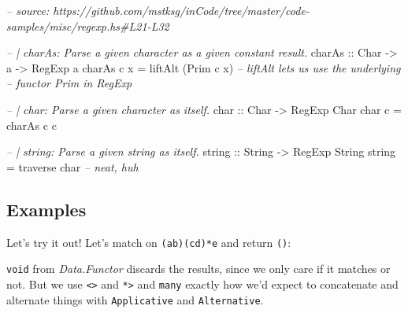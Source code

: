 \documentclass[]{article}
\newenvironment{Shaded}{}{}
\newcommand{\CharTok}[1]{\textcolor[rgb]{0.25,0.44,0.63}{#1}}
\newcommand{\CommentTok}[1]{\textcolor[rgb]{0.38,0.63,0.69}{\textit{#1}}}
\newcommand{\DataTypeTok}[1]{\textcolor[rgb]{0.56,0.13,0.00}{#1}}
\newcommand{\FunctionTok}[1]{\textcolor[rgb]{0.02,0.16,0.49}{#1}}
\newcommand{\NormalTok}[1]{#1}
\newcommand{\OtherTok}[1]{\textcolor[rgb]{0.00,0.44,0.13}{#1}}
\newcommand{\StringTok}[1]{\textcolor[rgb]{0.25,0.44,0.63}{#1}}
\begin{document}
\begin{Shaded}
\begin{Highlighting}[]
\CommentTok{-- source: https://github.com/mstksg/inCode/tree/master/code-samples/misc/regexp.hs#L21-L32}

\CommentTok{-- | charAs: Parse a given character as a given constant result.}
\OtherTok{charAs ::} \DataTypeTok{Char} \OtherTok{->}\NormalTok{ a }\OtherTok{->} \DataTypeTok{RegExp}\NormalTok{ a}
\NormalTok{charAs c x }\FunctionTok{=}\NormalTok{ liftAlt (}\DataTypeTok{Prim}\NormalTok{ c x)     }\CommentTok{-- liftAlt lets us use the underlying}
                                    \CommentTok{-- functor Prim in RegExp}

\CommentTok{-- | char: Parse a given character as itself.}
\OtherTok{char ::} \DataTypeTok{Char} \OtherTok{->} \DataTypeTok{RegExp} \DataTypeTok{Char}
\NormalTok{char c }\FunctionTok{=}\NormalTok{ charAs c c}

\CommentTok{-- | string: Parse a given string as itself.}
\OtherTok{string ::} \DataTypeTok{String} \OtherTok{->} \DataTypeTok{RegExp} \DataTypeTok{String}
\NormalTok{string }\FunctionTok{=} \FunctionTok{traverse}\NormalTok{ char              }\CommentTok{-- neat, huh}
\end{Highlighting}
\end{Shaded}

\hypertarget{examples}{%
\subsection{Examples}\label{examples}}

Let's try it out! Let's match on \texttt{(a\textbar{}b)(cd)*e} and return
\texttt{()}:

\begin{Shaded}
\end{Shaded}

\texttt{void} from \emph{Data.Functor} discards the results, since we only care
if it matches or not. But we use \texttt{\textless{}\textbar{}\textgreater{}}
and \texttt{*\textgreater{}} and \texttt{many} exactly how we'd expect to
concatenate and alternate things with \texttt{Applicative} and
\texttt{Alternative}.
\end{document}
